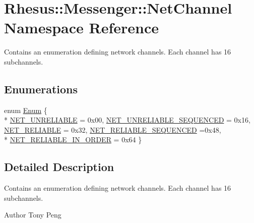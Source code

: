 \hypertarget{namespace_rhesus_1_1_messenger_1_1_net_channel}{\section{Rhesus\-:\-:Messenger\-:\-:Net\-Channel Namespace Reference}
\label{namespace_rhesus_1_1_messenger_1_1_net_channel}
}


Contains an enumeration defining network channels. Each channel has 16 subchannels.  


\subsection*{Enumerations}
\begin{DoxyCompactItemize}
\item 
enum \hyperlink{namespace_rhesus_1_1_messenger_1_1_net_channel_a5f3984e5aa9705ccb439f012018eb1e6}{Enum} \{ \\*
\hyperlink{namespace_rhesus_1_1_messenger_1_1_net_channel_a5f3984e5aa9705ccb439f012018eb1e6a618c98163daf4b0c4d522e844c023683}{N\-E\-T\-\_\-\-U\-N\-R\-E\-L\-I\-A\-B\-L\-E} = 0x00, 
\hyperlink{namespace_rhesus_1_1_messenger_1_1_net_channel_a5f3984e5aa9705ccb439f012018eb1e6ad8b38328fc1cd5618eb8d9ee346544ab}{N\-E\-T\-\_\-\-U\-N\-R\-E\-L\-I\-A\-B\-L\-E\-\_\-\-S\-E\-Q\-U\-E\-N\-C\-E\-D} = 0x16, 
\hyperlink{namespace_rhesus_1_1_messenger_1_1_net_channel_a5f3984e5aa9705ccb439f012018eb1e6a5b709f92632b2b96ace558d5cd157352}{N\-E\-T\-\_\-\-R\-E\-L\-I\-A\-B\-L\-E} = 0x32, 
\hyperlink{namespace_rhesus_1_1_messenger_1_1_net_channel_a5f3984e5aa9705ccb439f012018eb1e6adb1b40c11b8aba8164d3d13cca3fa257}{N\-E\-T\-\_\-\-R\-E\-L\-I\-A\-B\-L\-E\-\_\-\-S\-E\-Q\-U\-E\-N\-C\-E\-D} =0x48, 
\\*
\hyperlink{namespace_rhesus_1_1_messenger_1_1_net_channel_a5f3984e5aa9705ccb439f012018eb1e6ac650fd014853518a4aa2e9517c55cc69}{N\-E\-T\-\_\-\-R\-E\-L\-I\-A\-B\-L\-E\-\_\-\-I\-N\-\_\-\-O\-R\-D\-E\-R} = 0x64
 \}
\end{DoxyCompactItemize}


\subsection{Detailed Description}
Contains an enumeration defining network channels. Each channel has 16 subchannels. \begin{DoxyAuthor}{Author}
Tony Peng 
\end{DoxyAuthor}


